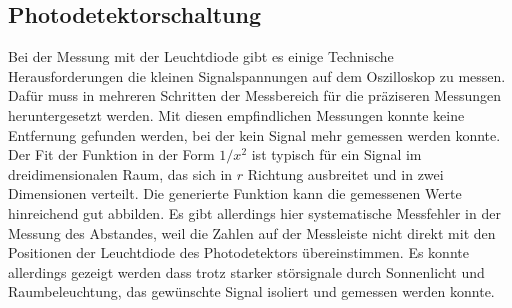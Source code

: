 \subsection{Photodetektorschaltung}

Bei der Messung mit der Leuchtdiode gibt es einige Technische Herausforderungen die kleinen Signalspannungen auf dem Oszilloskop zu messen.
Dafür muss in mehreren Schritten der Messbereich für die präziseren Messungen heruntergesetzt werden.
Mit diesen empfindlichen Messungen konnte keine Entfernung gefunden werden, bei der kein Signal mehr gemessen werden konnte. 
Der Fit der Funktion in der Form $1/x^2$ ist typisch für ein Signal im dreidimensionalen Raum,
das sich in $r$ Richtung ausbreitet und in zwei Dimensionen verteilt.
Die generierte Funktion kann die gemessenen Werte hinreichend gut abbilden.
Es gibt allerdings hier systematische Messfehler in der Messung des Abstandes, 
weil die Zahlen auf der Messleiste nicht direkt mit den Positionen der Leuchtdiode des Photodetektors übereinstimmen.
Es konnte allerdings gezeigt werden dass trotz starker störsignale durch Sonnenlicht und Raumbeleuchtung, 
das gewünschte Signal isoliert und gemessen werden konnte.